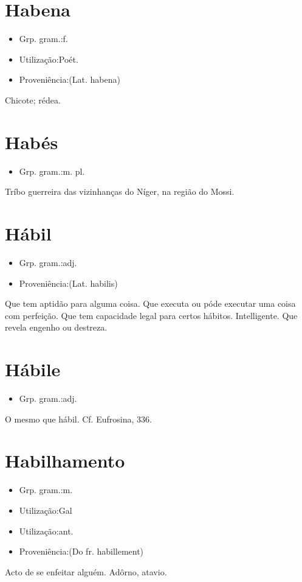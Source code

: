 \documentclass{article}
\begin{document}
\section{Habena}
\begin{itemize}
\item {Grp. gram.:f.}
\end{itemize}
\begin{itemize}
\item {Utilização:Poét.}
\end{itemize}
\begin{itemize}
\item {Proveniência:(Lat. \textunderscore habena\textunderscore )}
\end{itemize}
Chicote; rédea.
\section{Habés}
\begin{itemize}
\item {Grp. gram.:m. pl.}
\end{itemize}
Tríbo guerreira das vizinhanças do Níger, na região do Mossi.
\section{Hábil}
\begin{itemize}
\item {Grp. gram.:adj.}
\end{itemize}
\begin{itemize}
\item {Proveniência:(Lat. \textunderscore habilis\textunderscore )}
\end{itemize}
Que tem aptidão para alguma coisa.
Que executa ou póde executar uma coisa com perfeição.
Que tem capacidade legal para certos hábitos.
Intelligente.
Que revela engenho ou destreza.
\section{Hábile}
\begin{itemize}
\item {Grp. gram.:adj.}
\end{itemize}
O mesmo que \textunderscore hábil\textunderscore . Cf. \textunderscore Eufrosina\textunderscore , 336.
\section{Habilhamento}
\begin{itemize}
\item {Grp. gram.:m.}
\end{itemize}
\begin{itemize}
\item {Utilização:Gal}
\end{itemize}
\begin{itemize}
\item {Utilização:ant.}
\end{itemize}
\begin{itemize}
\item {Proveniência:(Do fr. \textunderscore habillement\textunderscore )}
\end{itemize}
Acto de se enfeitar alguém.
Adôrno, atavio.
\end{document}
